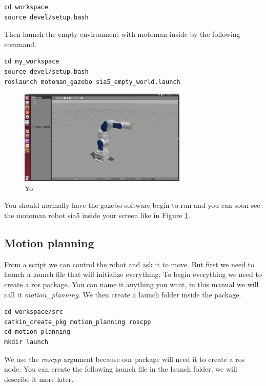 \begin{lstlisting}
cd workspace
source devel/setup.bash
\end{lstlisting}

Then launch the empty environment with motoman inside by the following command.

\begin{lstlisting}
cd my_workspace
source devel/setup.bash
roslaunch motoman_gazebo sia5_empty_world.launch
\end{lstlisting}
\begin{figure}
\includegraphics[width=8cm]{images/utilisation/launch_gazebo.png}
\centering
\caption{Yo}
\label{fig:launch_gazebo}
\end{figure}
You should normally have the gazebo software begin to run and you can soon see the motoman robot sia5 inside your screen like in Figure \ref{fig:launch_gazebo}.

\subsection{Motion planning}

From a script we can control the robot and ask it to move. But first we need to launch a launch file that will initialize everything. To begin everything we need to create a ros package. You can name it anything you want, in this manual we will call it \emph{motion\_planning}. We then create a launch folder inside the package.


\begin{lstlisting}
cd workspace/src
catkin_create_pkg motion_planning roscpp
cd motion_planning
mkdir launch
\end{lstlisting}

We use the \emph{roscpp} argument because our package will need it to create a ros node. You can create the following launch file in the launch folder, we will describe it more later. 


